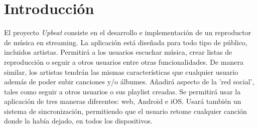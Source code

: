 \documentclass{article}
\begin{document}
\maketitle
\newpage
\section*{Introducción}
El proyecto \textit{Upbeat} consiste en el desarrollo e implementación de un reproductor de música en streaming.
\hfill \break
La aplicación está diseñada para todo tipo de público, incluidos artistas. Permitirá a los usuarios escuchar música, crear listas de reproducción o seguir a otros usuarios entre otras funcionalidades.
\hfill \break
De manera similar, los artistas tendrán las mismas características que cualquier usuario además de poder subir canciones y/o álbumes.
\hfill \break
Añadirá aspecto de la 'red social', tales como seguir a otros usuarios o sus playlist creadas.
\hfill \break
Se permitirá usar la aplicación de tres maneras diferentes: web, Android e iOS.
Usará también un sistema de sincronización, permitiendo que el usuario retome cualquier canción donde la había dejado, en todos los dispositivos.

\newpage
\tableofcontents %
{}
\newpage
\pagestyle{fancy}
\end{document}
